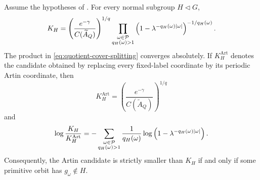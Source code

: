 \begin{theorem}
\label{thm:quotient-cover-splitting}
Assume the hypotheses of .  For every normal
subgroup \(H\triangleleft G\),
\begin{equation}\label{eq:quotient-cover-splitting}
 K_H=
 \left(\frac{e^{-\gamma}}{C(\widetilde A_Q)}\right)^{1/q}
 \prod_{\substack{\omega\in\mathcal P\\q_H(\omega)>1}}
 \left(1-\lambda^{-q_H(\omega)|\omega|}\right)^{-1/q_H(\omega)}.
\end{equation}
The product in \eqref{eq:quotient-cover-splitting} converges absolutely.
If \(K_H^{\mathrm{Art}}\) denotes the candidate obtained by replacing every
fixed-label coordinate by its periodic Artin coordinate, then
\begin{equation}\label{eq:quotient-artin-candidate}
 K_H^{\mathrm{Art}}
 =\left(\frac{e^{-\gamma}}{C(\widetilde A_Q)}\right)^{1/q}
\end{equation}
and
\begin{equation}\label{eq:quotient-artin-positive-error}
 \log\frac{K_H}{K_H^{\mathrm{Art}}}
 =-\sum_{\substack{\omega\in\mathcal P\\q_H(\omega)>1}}
    \frac{1}{q_H(\omega)}
    \log\left(1-\lambda^{-q_H(\omega)|\omega|}\right).
\end{equation}
Consequently, the Artin candidate is strictly smaller than \(K_H\) if and
only if some primitive orbit has \(g_\omega\notin H\).
\end{theorem}

